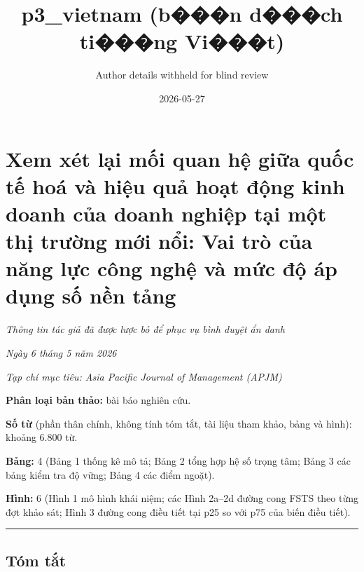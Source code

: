 \documentclass[12pt,a4paper]{article}
\title{p3\_vietnam (b���n d���ch ti���ng Vi���t)}
\author{Author details withheld for blind review}
\date{2026-05-27}
\begin{document}
\maketitle

\hypertarget{xem-xuxe9t-lux1ea1i-mux1ed1i-quan-hux1ec7-giux1eefa-quux1ed1c-tux1ebf-houxe1-vuxe0-hiux1ec7u-quux1ea3-houx1ea1t-ux111ux1ed9ng-kinh-doanh-cux1ee7a-doanh-nghiux1ec7p-tux1ea1i-mux1ed9t-thux1ecb-trux1b0ux1eddng-mux1edbi-nux1ed5i-vai-truxf2-cux1ee7a-nux103ng-lux1ef1c-cuxf4ng-nghux1ec7-vuxe0-mux1ee9c-ux111ux1ed9-uxe1p-dux1ee5ng-sux1ed1-nux1ec1n-tux1ea3ng}{%
\section{Xem xét lại mối quan hệ giữa quốc tế hoá và hiệu quả hoạt động
kinh doanh của doanh nghiệp tại một thị trường mới nổi: Vai trò của năng
lực công nghệ và mức độ áp dụng số nền
tảng}\label{xem-xuxe9t-lux1ea1i-mux1ed1i-quan-hux1ec7-giux1eefa-quux1ed1c-tux1ebf-houxe1-vuxe0-hiux1ec7u-quux1ea3-houx1ea1t-ux111ux1ed9ng-kinh-doanh-cux1ee7a-doanh-nghiux1ec7p-tux1ea1i-mux1ed9t-thux1ecb-trux1b0ux1eddng-mux1edbi-nux1ed5i-vai-truxf2-cux1ee7a-nux103ng-lux1ef1c-cuxf4ng-nghux1ec7-vuxe0-mux1ee9c-ux111ux1ed9-uxe1p-dux1ee5ng-sux1ed1-nux1ec1n-tux1ea3ng}}

\emph{Thông tin tác giả đã được lược bỏ để phục vụ bình duyệt ẩn danh}

\emph{Ngày 6 tháng 5 năm 2026}

\emph{Tạp chí mục tiêu: Asia Pacific Journal of Management (APJM)}

\textbf{Phân loại bản thảo:} bài báo nghiên cứu.

\textbf{Số từ} (phần thân chính, không tính tóm tắt, tài liệu tham khảo,
bảng và hình): khoảng 6.800 từ.

\textbf{Bảng:} 4 (Bảng 1 thống kê mô tả; Bảng 2 tổng hợp hệ số trọng
tâm; Bảng 3 các bảng kiểm tra độ vững; Bảng 4 các điểm ngoặt).

\textbf{Hình:} 6 (Hình 1 mô hình khái niệm; các Hình 2a--2d đường cong
FSTS theo từng đợt khảo sát; Hình 3 đường cong điều tiết tại p25 so với
p75 của biến điều tiết).

\begin{center}\rule{0.5\linewidth}{0.5pt}\end{center}

\hypertarget{tuxf3m-tux1eaft}{%
\subsection{Tóm tắt}\label{tuxf3m-tux1eaft}}
\end{document}
